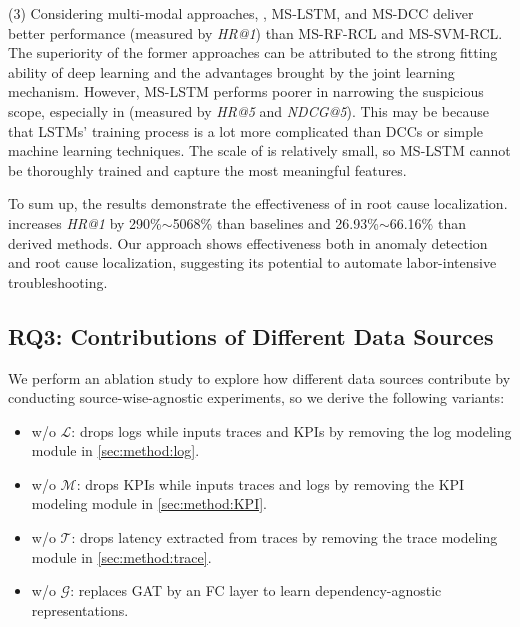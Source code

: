 (3) Considering multi-modal approaches, \name, MS-LSTM, and MS-DCC deliver better performance (measured by \textit{HR@1}) than MS-RF-RCL and MS-SVM-RCL.
The superiority of the former approaches can be attributed to the strong fitting ability of deep learning and the advantages brought by the joint learning mechanism.
However, MS-LSTM performs poorer in narrowing the suspicious scope, especially in \B (measured by \textit{HR@5} and \textit{NDCG@5}).
This may be because that LSTMs' training process is a lot more complicated than DCCs or simple machine learning techniques. The scale of \B is relatively small, so MS-LSTM cannot be thoroughly trained and capture the most meaningful features.

To sum up, the results demonstrate the effectiveness of \name in root cause localization. \name increases \textit{HR@1} by 290\%$\sim$5068\% than baselines and 26.93\%$\sim$66.16\% than derived methods.
Our approach shows effectiveness both in anomaly detection and root cause localization, suggesting its potential to automate labor-intensive troubleshooting.

\subsection{\textbf{RQ3}: Contributions of Different Data Sources}
We perform an ablation study to explore how different data sources contribute by conducting source-wise-agnostic experiments, so we derive the following variants:

\begin{itemize}[leftmargin=12pt, topsep=0pt]
    \item \name w/o $\mathcal{L}$: drops logs while inputs traces and KPIs by removing the log modeling module in \cref{sec:method:log}.
    \item \name w/o $\mathcal{M}$: drops KPIs while inputs traces and logs by removing the KPI modeling module in \cref{sec:method:KPI}.
    \item \name w/o $\mathcal{T}$: drops latency extracted from traces by removing the trace modeling module in \cref{sec:method:trace}.
    \item \name w/o $\mathcal{G}$: replaces GAT by an FC layer to learn dependency-agnostic representations.
\end{itemize}

